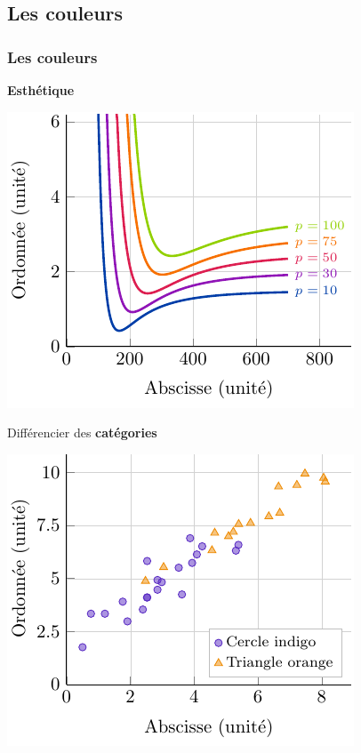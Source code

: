 \documentclass[aspectratio=169]{beamer}
\begin{document}
\subsection{Les couleurs}
\label{sub:les_couleurs}


\begin{frame}[c]\frametitle{Les couleurs}

\vspace{-2mm}

\begin{minipage}[t]{.49\textwidth}
\centering
\textbf{Esthétique}
\vspace*{3mm}

\includegraphics[scale=.45]{examples/lineplot_example.pdf}
\end{minipage}
\begin{minipage}[t]{.49\textwidth}
\centering
Différencier des \textbf{catégories}
\vspace*{3mm}

\includegraphics[scale=.45]{examples/scatterplot_example.pdf}
\end{minipage}



\end{frame}
\end{document}
